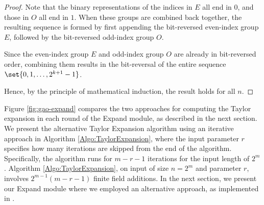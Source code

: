 \begin{proof}
	Note that the binary representations of the indices in $E$ all end in $0$, and those in $O$ all end in $1$. When these groups are combined back together, the resulting sequence is formed by first appending the bit-reversed even-index group $E$, followed by the bit-reversed odd-index group $O$.
	
	Since the even-index group $E$ and odd-index group $O$ are already in bit-reversed order, combining them results in the bit-reversal of the entire sequence $\set{0, 1, \ldots, 2^{k+1} - 1}$.
	
	Hence, by the principle of mathematical induction, the result holds for all $n$.
	
\end{proof}



Figure \ref{fig:gao-expand} compares the two approaches for computing the Taylor expansion in each round of the \textsf{Expand} module, as described in the next section. We present the alternative Taylor Expansion algorithm using an iterative approach in Algorithm \ref{Algo:TaylorExpansion}, where the input parameter $r$ specifies how many iterations are skipped from the end of the algorithm. Specifically, the algorithm runs for $m - r - 1$ iterations for the input length of $2^m$. Algorithm \ref{Algo:TaylorExpansion}, on input of size $n = 2^m$ and parameter $r$, involves $2^{m-1}(m - r - 1)$ finite field additions. In the next section, we present our \textsf{Expand} module where we employed an alternative approach, as implemented in \cite{libiop}.











